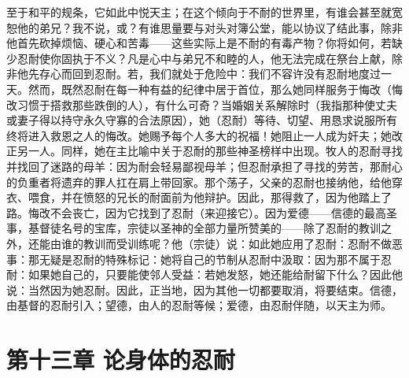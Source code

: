 至于和平的规条，它如此中悦天主；在这个倾向于不耐的世界里，有谁会甚至就宽恕他的弟兄？我不说，或？有谁思量要与对头对簿公堂，能以协议了结此事，除非他首先砍掉烦恼、硬心和苦毒——这些实际上是不耐的有毒产物？你将如何，若缺少忍耐使你固执于不义？凡是心中与弟兄不和睦的人，他无法完成在祭台上献，除非他先存心而回到忍耐。若，我们就处于危险中：我们不容许没有忍耐地度过一天。然而，既然忍耐在每一种有益的纪律中居于首位，那么她同样服务于悔改（悔改习惯于搭救那些跌倒的人），有什么可奇？当婚姻关系解除时（我指那种使丈夫或妻子得以持守永久守寡的合法原因），她（忍耐）等待、切望、用恳求说服所有终将进入救恩之人的悔改。她赐予每个人多大的祝福！她阻止一人成为奸夫；她改正另一人。同样，她在主比喻中关于忍耐的那些神圣榜样中出现。牧人的忍耐寻找并找回了迷路的母羊：因为耐会轻易鄙视母羊；但忍耐承担了寻找的劳苦，那耐心的负重者将遗弃的罪人扛在肩上带回家。那个荡子，父亲的忍耐也接纳他，给他穿衣、喂食，并在愤怒的兄长的耐面前为他辩护。因此，那得救了，因为他踏上了路。悔改不会丧亡，因为它找到了忍耐（来迎接它）。因为爱德——信德的最高圣事，基督徒名号的宝库，宗徒以圣神的全部力量所赞美的——除了忍耐的教训之外，还能由谁的教训而受训练呢？他（宗徒）说：如此她应用了忍耐：忍耐不做恶事：那无疑是忍耐的特殊标记：她将自己的节制从忍耐中汲取：因为那不属于忍耐：如果她自己的，只要能使邻人受益：若她发怒，她还能给耐留下什么？因此他说：当然因为她忍耐。因此，正当地，因为其他一切都要取消，将要结束。信德，由基督的忍耐引入；望德，由人的忍耐等候；爱德，由忍耐伴随，以天主为师。\par


\section{第十三章 论身体的忍耐}


